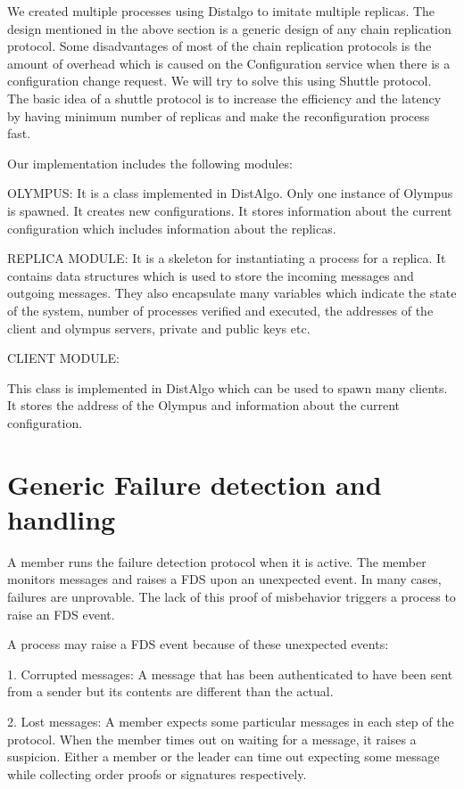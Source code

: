 \documentclass[letterpaper, 10 pt, conference]{ieeeconf}  %
\begin{document}
We created multiple processes using Distalgo to imitate multiple replicas.
The design mentioned in the above section is a generic design of any chain replication protocol. Some disadvantages of most of the chain replication protocols is the amount of overhead which is caused on the Configuration service when there is a configuration change request.
We will try to solve this using Shuttle protocol. The basic idea of a shuttle protocol is to increase the efficiency and the latency by having minimum number of replicas and make the reconfiguration process fast.

Our implementation includes the following modules:

OLYMPUS: It is a class implemented in DistAlgo. Only one instance of Olympus is spawned. It creates new configurations. It stores information about the current configuration which includes information about the replicas. 

REPLICA MODULE: It is a skeleton for instantiating a process for a replica. It contains data structures which is used to store the incoming messages and outgoing messages. They also encapsulate many variables which indicate the state of the system, number of processes verified and executed, the addresses of the client and olympus servers, private and public keys etc.

CLIENT MODULE: 

This class is implemented in DistAlgo which can be used to spawn many clients. It stores the address of the Olympus and information about the current configuration.  



\section{Generic Failure detection and handling}

A member runs the failure detection protocol when it is active. The member monitors messages and raises a FDS upon an unexpected event. In many cases, failures are unprovable. The lack of this proof of misbehavior triggers a process to raise an FDS event.

A process may raise a FDS event because of these unexpected events:

1. Corrupted messages: A message that has been authenticated to have been sent from a sender but its contents are different than the actual. 

2. Lost messages: A member expects some particular messages in each step of the protocol. When the member times out on waiting for a message, it raises a suspicion. Either a member or the leader can time out expecting some message while collecting order proofs or signatures respectively.
\end{document}
